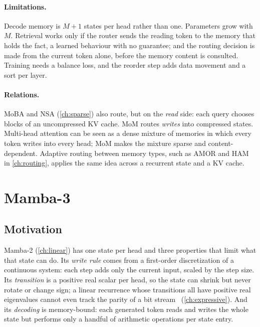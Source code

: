 \paragraph{Limitations.} Decode memory is $M+1$ states per head rather than one. Parameters
grow with $M$. Retrieval works only if the router sends the reading token to the memory that
holds the fact, a learned behaviour with no guarantee; and the routing decision is made
from the current token alone, before the memory content is consulted. Training needs a
balance loss, and the reorder step adds data movement and a sort per layer.

\paragraph{Relations.} MoBA and NSA (\cref{ch:sparse}) also route, but on the \emph{read} side:
each query chooses blocks of an uncompressed KV cache. MoM routes \emph{writes} into
compressed states. Multi-head attention can be seen as a dense mixture of memories in which
every token writes into every head; MoM makes the mixture sparse and content-dependent.
Adaptive routing between memory types, such as AMOR and HAM in \cref{ch:routing}, applies
the same idea across a recurrent state and a KV cache.

\section{Mamba-3}\label{sec:c07-mamba3}

\subsection{Motivation}

Mamba-2 (\cref{ch:linear}) has one state per head and three properties that limit what that
state can do. Its \emph{write rule} comes from a first-order discretization of a continuous
system: each step adds only the current input, scaled by the step size. Its \emph{transition}
is a positive real scalar per head, so the state can shrink but never rotate or change sign;
a linear recurrence whose transitions all have positive real eigenvalues cannot even track
the parity of a bit stream~\citep{c03-grazzi2025unlocking,c06-merrill2024illusion}
(\cref{ch:expressive}). And its \emph{decoding} is memory-bound: each generated token reads and
writes the whole state but performs only a handful of arithmetic operations per state entry.

